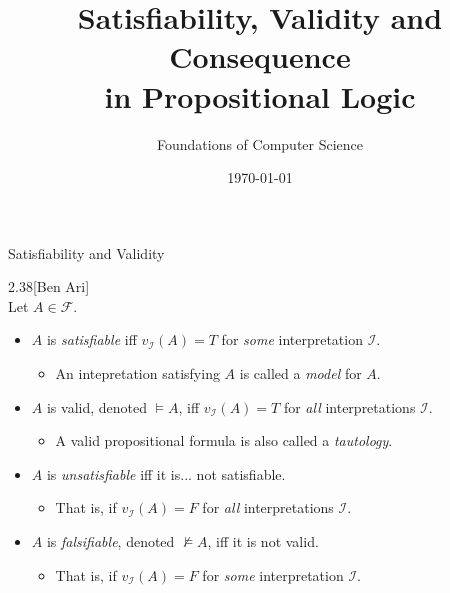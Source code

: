 \documentclass[style=sailor,size=12pt]{powerdot}
\title{Satisfiability, Validity and Consequence \\ in Propositional Logic}
\author{Foundations of Computer Science}
\date{\today}
\begin{document}
\maketitle

\begin{wideslide}[bm=,toc=]{Satisfiability and Validity}
\begin{defn}{2.38}[Ben Ari]
~\\Let $A \in \mathcal{F}$.
\begin{itemize}
\item<2-> $A$ is \emph{satisfiable} iff $v_{\mathcal{I}}(A) = T$ for \emph{some}
      interpretation $\mathcal{I}$.\\

\begin{itemize}
\item<3-> An intepretation satisfying $A$ is called a \emph{model} for $A$.
\end{itemize}

\item<4-> $A$ is valid, denoted $\models A$, iff $v_{\mathcal{I}}(A)=T$ for
      \emph{all} interpretations $\mathcal{I}$.\\
\begin{itemize}
\item<5-> A valid propositional formula is also called a \emph{tautology}.
\end{itemize}

\item<6-> $A$ is \emph{unsatisfiable} iff it is... \pause[6] not satisfiable. 
\begin{itemize}
\item<8-> That is, if
      $v_{\mathcal{I}}(A) = F$ for \emph{all} interpretations $\mathcal{I}$.
\end{itemize}

\item<9-> $A$ is \emph{falsifiable}, denoted $\not\models A$, iff it is not valid.
\begin{itemize}
\item<10->  That is, if $v_{\mathcal{I}}(A) = F$ for \emph{some} interpretation
      $\mathcal{I}$.
\end{itemize}
\end{itemize}
\end{defn}
\end{wideslide}
\end{document}
